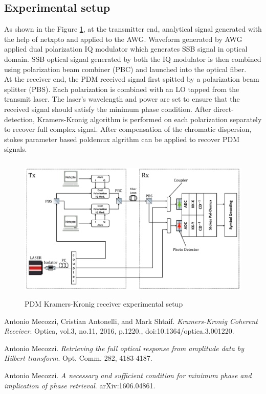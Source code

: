 \subsection{Experimental setup}
 As shown in the Figure \ref{Practical_setup_TxRx}, at the transmitter end, analytical signal generated with the help of netxpto and applied to the AWG. Waveform generated by AWG applied dual polarization IQ modulator which generates SSB signal in optical domain. SSB optical signal generated by both the IQ modulator is then combined using polarization beam combiner (PBC) and launched into the optical fiber.\\
 At the receiver end, the PDM received signal first spitted by a polarization beam splitter (PBS). Each polarization is combined with an LO tapped from the transmit laser. The laser's wavelength and power are set to ensure that the received signal should satisfy the minimum phase condition. After direct-detection, Kramers-Kronig algorithm is performed on each polarization separately to recover full complex signal. After compensation of the chromatic dispersion, stokes parameter based poldemux algrithm can be applied to recover PDM signals.     
\begin{figure}[h]
	\centering
	\includegraphics[width=1.0\textwidth, height=7cm]{./sdf/simplified_coherent_receiver/figures/Practical_setup_TxRx.pdf}
	\caption{PDM Kramers-Kronig receiver experimental setup}\label{Practical_setup_TxRx}
\end{figure}


\begin{thebibliography}{9}
	Antonio Mecozzi, Cristian Antonelli, and Mark Shtaif.
	\textit{Kramers-Kronig Coherent Receiver}.
	Optica, vol.3, no.11, 2016, p.1220., doi:10.1364/optica.3.001220.
	
	Antonio Mecozzi.
	\textit{Retrieving the full optical response from amplitude data by Hilbert transform}. Opt. Comm. 282, 4183-4187.
	
	Antonio Mecozzi.
	\textit{A necessary and sufficient condition for minimum phase and implication of phase retrieval}. arXiv:1606.04861.
\end{thebibliography}

